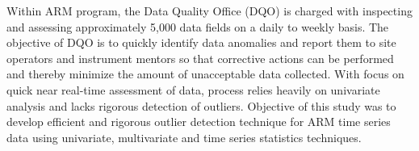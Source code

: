 Within ARM program, the Data Quality Office (DQO) is charged with 
inspecting and assessing approximately 5,000 data fields on a daily 
to weekly basis. The objective of DQO is to quickly identify data 
anomalies and report them to site operators and instrument mentors 
so that corrective actions can be performed and thereby minimize the 
amount of unacceptable data collected. With focus on quick near real-time 
assessment of data, process relies heavily on univariate analysis and lacks 
rigorous detection of outliers. Objective of this study was to develop
efficient and rigorous  outlier detection technique for ARM time series
data using univariate, multivariate and time series statistics
techniques.
